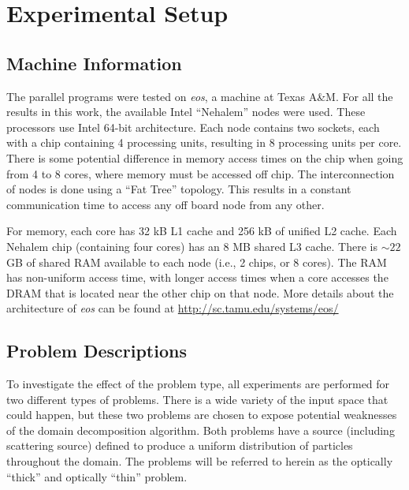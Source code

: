\documentclass[12pt]{article}
\begin{document}
{{\section{Experimental Setup}

\subsection{Machine Information}

The parallel programs were tested on \emph{eos}, a machine at Texas A\&M. For all the
results in this work, the available Intel ``Nehalem'' nodes were used. These
processors use Intel 64-bit architecture.  Each node contains two sockets, each with
a chip containing 4 processing units, resulting in 8 processing units per core.  There is some potential difference in
memory access times on the chip when going from 4 to 8 cores, where memory must be
accessed off chip.  The interconnection of nodes is done using a ``Fat Tree'' topology.  This
results in a constant communication time to access any off board node from any other.

For memory, each core has 32 kB L1 cache and 256 kB of unified L2 cache. Each Nehalem
chip (containing four cores) has an 8 MB shared L3 cache.  There is $\sim 22$ GB of
shared RAM available to each node (i.e., 2 chips, or 8 cores). The RAM has non-uniform access time,
with longer access times when a core accesses the DRAM that is located near the other
chip on that node. More details about the architecture of \emph{eos} can be found
at \url{http://sc.tamu.edu/systems/eos/}

\subsection{Problem Descriptions}
    
To investigate the effect of the problem type, all experiments are performed for two
different types of problems. There is a wide variety of the input space that could
happen, but these two problems are chosen to expose potential weaknesses of the
domain decomposition algorithm.  Both problems have a source (including scattering
source) defined to produce a uniform distribution of particles throughout the domain. 
The problems will be referred to herein as the optically ``thick'' and optically
``thin'' problem.  

}}
\end{document}
